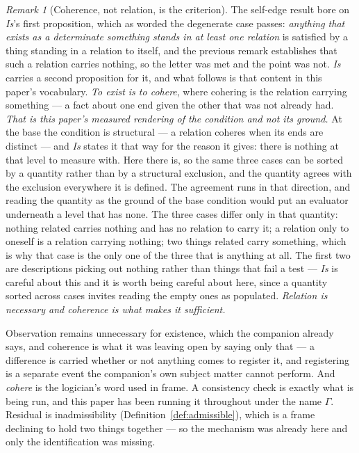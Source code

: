 \documentclass[11pt,a4paper]{article}
\theoremstyle{remark}\newtheorem{remark}[definition]{Remark}
\begin{document}
\begin{remark}[Coherence, not relation, is the criterion]\label{rem:cohere}
The self-edge result bore on \emph{Is}'s first proposition, which as worded the degenerate case
passes: \emph{anything that exists as a determinate something stands in at least one relation} is
satisfied by a thing standing in a relation to itself, and the previous remark establishes that such a
relation carries nothing, so the letter was met and the point was not. \emph{Is} carries a
second proposition for it, and what follows is that content in this paper's vocabulary. \emph{To exist is to
cohere}, where cohering is the relation carrying something --- a fact about one end given the other that
was not already had. \emph{That is this paper's measured rendering of the condition and not its
ground.} At the base the condition is structural --- a relation coheres when its ends are distinct ---
and \emph{Is} states it that way for the reason it gives: there is nothing at that level to
measure with. Here there is, so the same three cases can be sorted by a quantity rather than by a
structural exclusion, and the quantity agrees with the exclusion everywhere it is defined. The
agreement runs in that direction, and reading the quantity as the ground of the base condition would
put an evaluator underneath a level that has none. The three cases differ only in that quantity: nothing related carries nothing and has no relation to
carry it; a relation only to oneself is a relation carrying nothing; two things related carry something,
which is why that case is the only one of the three that is anything at all. The first two are
descriptions picking out nothing rather than things that fail a test --- \emph{Is} is careful about
this and it is worth being careful about here, since a quantity sorted across cases invites reading the
empty ones as populated. \emph{Relation is necessary and coherence is what makes it sufficient.}

Observation remains unnecessary for existence, which the
companion already says, and coherence is what it was leaving open by saying only that --- a difference is
carried whether or not anything comes to register it, and registering is a separate event the
companion's own subject matter cannot perform. And \emph{cohere} is the logician's word used
in frame. A consistency check is exactly what is being run, and this paper has been running it throughout under the name $\Gamma$.
Residual is inadmissibility (Definition~\ref{def:admissible}), which is a frame declining to hold two
things together --- so the mechanism was already here and only the identification was missing.


\end{remark}
\end{document}
